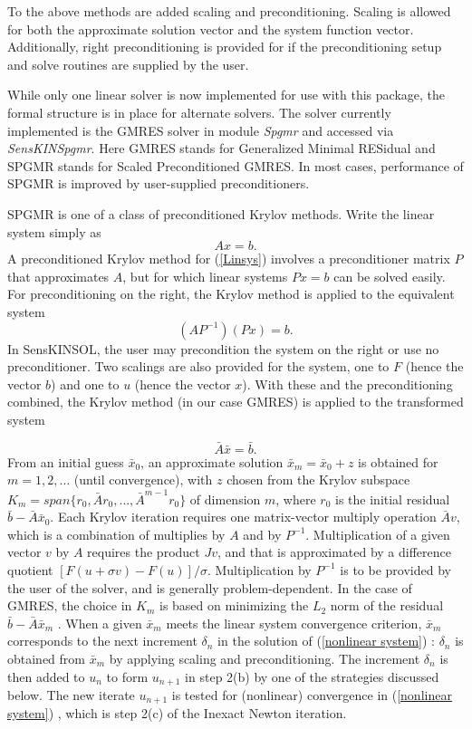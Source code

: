 \documentclass[11pt]{article}
\begin{document}
To the above methods are added scaling and preconditioning. Scaling is
allowed for both the approximate solution vector and the system
function vector. Additionally, right preconditioning is provided for if
the preconditioning setup and solve routines are supplied by the user.

While only one linear solver is now implemented for use with this
package, the formal structure is in place for alternate solvers. The
solver currently implemented is the GMRES solver \cite{BrHi89,SaSc86}
in module {\em Spgmr} and accessed via {\em SensKINSpgmr}. Here GMRES
stands for Generalized Minimal RESidual and SPGMR stands for Scaled
Preconditioned GMRES. In most cases, performance of SPGMR is improved
by user-supplied preconditioners.

SPGMR is one of a class of preconditioned Krylov methods.  Write the
linear system  simply as
\begin{equation}
 A x = b . \label{Linsys}
\end{equation}
A preconditioned Krylov method for (\ref{Linsys}) involves a
preconditioner matrix $P$ that approximates $A$, but for which
linear systems $Px=b$ can be solved easily.  For preconditioning
on the right, the Krylov method is applied to the equivalent system
\begin{equation}
 (A P^{-1}) (P x) = b .
\end{equation}
In SensKINSOL, the user may precondition the system on the right or use
no preconditioner. Two scalings are also provided for the system, one
to $F$ (hence the vector $b$) and one to $u$ (hence the vector $x$).
With these and the preconditioning combined, the Krylov method (in our
case GMRES) is applied to the transformed system

\begin{equation}
 \bar{A} \bar{x} = \bar{b} .
\end{equation}
From an initial guess $\bar{x}_0$, an approximate solution $\bar{x}_m
= \bar{x}_0 + z$ is obtained for $m = 1, 2, \ldots$ (until
convergence), with $z$ chosen from the Krylov subspace $K_m =
span\{r_0, \bar{A}r_0, \ldots, \bar{A}^{m-1}r_0\}$ of dimension $m$,
where $r_0$ is the initial residual $\bar{b} - \bar{A} \bar{x}_0$.
Each Krylov iteration requires one matrix-vector multiply operation
$\bar{A} v$, which is a combination of multiplies by $A$ and by
$P^{-1}$.  Multiplication of a given vector $v$ by $A$ requires the
product $Jv$, and that is approximated by a difference quotient
$[F(u+\sigma v) - F(u)]/\sigma$. Multiplication by $P^{-1}$ is to be
provided by the user of the solver, and is generally problem-dependent.
In the case of GMRES, the choice in $K_m$ is based on minimizing the
$L_2$ norm of the residual $\bar{b} - \bar{A} \bar{x}_m$
\cite{BrHi89,SaSc86}. When a given $\bar{x}_m$ meets the linear system
convergence criterion, $\bar{x}_m$ corresponds to the next increment
$\delta_n$ in the solution of (\ref{nonlinear system}) : $\delta_n$ is
obtained from $\bar{x}_m$ by applying scaling and preconditioning. The
increment $\delta_n$ is then added to $u_n$ to form $u_{n+1}$ in step
2(b) by one of the strategies discussed below. The new iterate
$u_{n+1}$ is tested for (nonlinear) convergence in (\ref{nonlinear
system}) , which is step 2(c) of the Inexact Newton iteration.
\end{document}
